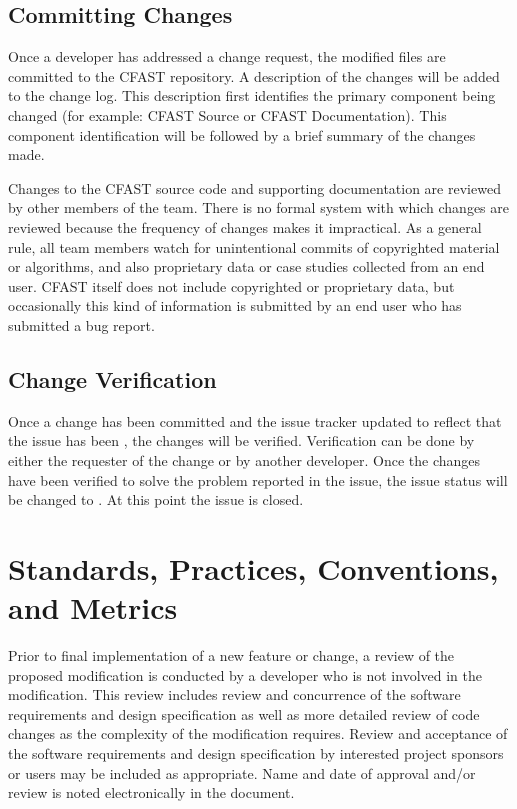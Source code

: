 \documentclass[12pt]{book}
\begin{document}
\subsection{Committing Changes}

Once a developer has addressed a change request, the modified files are committed to the CFAST repository.  A description of the changes will be added to the change log.  This description first identifies the primary component being changed (for example: CFAST Source or CFAST Documentation).  This component identification will be followed by a brief summary of the changes made.

Changes to the CFAST source code and supporting documentation are reviewed by other members of the team. There is no formal system with which changes are reviewed because the frequency of changes makes it impractical. As a general rule, all team members watch for unintentional commits of copyrighted material or algorithms, and also proprietary data or case studies collected from an end user. CFAST itself does not include copyrighted or proprietary data, but occasionally this kind of information is submitted by an end user who has submitted a bug report.

\subsection{Change Verification}

Once a change has been committed and the issue tracker updated to reflect that the issue has been , the changes will be verified.  Verification can be done by either the requester of the change or by another developer.  Once the changes have been verified to solve the problem reported in the issue, the issue status will be changed to .  At this point the issue is closed.

\section{Standards, Practices, Conventions, and Metrics}

Prior to final implementation of a new feature or change, a review of the proposed modification is conducted by a developer who is not involved in the modification.  This review includes review and concurrence of the software requirements and design specification as well as more detailed review of code changes as the complexity of the modification requires. Review and acceptance of the software requirements and design specification by interested project sponsors or users may be included as appropriate. Name and date of approval and/or review is noted electronically in the document.
\end{document}
